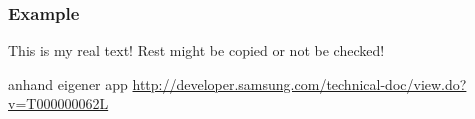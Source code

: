 \subsubsection{Example} \label{subsection:license-samsung-example}
This is my real text! Rest might be copied or not be checked!


anhand eigener app\newline
\url{http://developer.samsung.com/technical-doc/view.do?v=T000000062L}

